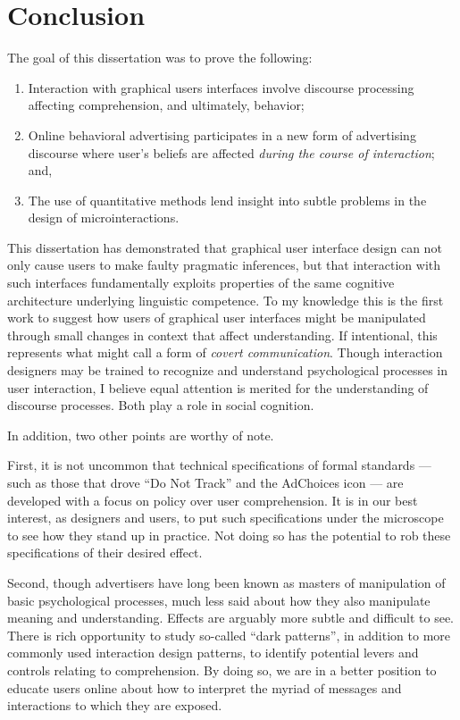 \section{Conclusion}
\label{conclusion}

The goal of this dissertation was to prove the following:

\begin{sloppier}
\begin{enumerate}
\item Interaction with graphical users interfaces involve discourse processing affecting comprehension, and ultimately, behavior;
\item Online behavioral advertising participates in a new form of advertising discourse where user's beliefs are affected \textit{during the course of interaction}; and,
\item The use of quantitative methods lend insight into subtle problems in the design of microinteractions.
\end{enumerate}
\end{sloppier}


This dissertation has demonstrated that graphical user interface design can not only cause users to make faulty pragmatic inferences, but that interaction with such interfaces fundamentally exploits properties of the same cognitive architecture underlying linguistic competence. To my knowledge this is the first work to suggest how users of graphical user interfaces might be manipulated through small changes in context that affect understanding. If intentional, this represents what  \cite{Sperber:1986uk}  might call a form of \emph{covert communication}. Though interaction designers may be trained to recognize and understand psychological processes in user interaction, I believe equal attention is merited for the understanding of discourse processes. Both play a role in social cognition.

In addition, two other points are worthy of note.

First, it is not uncommon that technical specifications of formal standards --- such as those that drove ``Do Not Track'' and the AdChoices icon --- are developed with a focus on policy over user comprehension. It is in our best interest, as designers and users, to put such specifications under the microscope to see how they stand up in practice. Not doing so has the potential to rob these specifications of their desired effect.

Second, though advertisers have long been known as masters of manipulation of basic psychological processes, much less said about how they also manipulate meaning and understanding. Effects are arguably more subtle and difficult to see. There is rich opportunity to study so-called ``dark patterns'', in addition to more commonly used interaction design patterns, to identify potential levers and controls relating to comprehension. By doing so, we are in a better position to educate users online about how to interpret the myriad of messages and interactions to which they are exposed.
